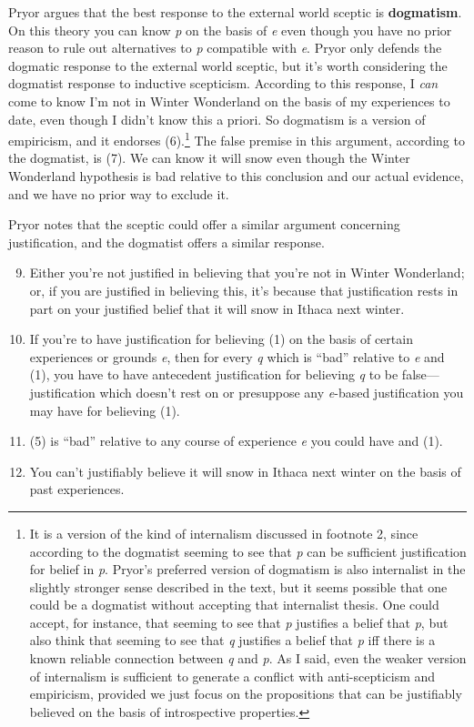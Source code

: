 Pryor argues that the best response to the external world sceptic is
\textbf{dogmatism}. On this theory you can know \emph{p} on the basis of
\emph{e} even though you have no prior reason to rule out alternatives
to \emph{p} compatible with \emph{e}. Pryor only defends the dogmatic
response to the external world sceptic, but it's worth considering the
dogmatist response to inductive scepticism. According to this response,
I \emph{can} come to know I'm not in Winter Wonderland on the basis of
my experiences to date, even though I didn't know this a priori. So
dogmatism is a version of empiricism, and it endorses (6).\footnote{It
  is a version of the kind of internalism discussed in footnote 2, since
  according to the dogmatist seeming to see that \emph{p} can be
  sufficient justification for belief in \emph{p}. Pryor's preferred
  version of dogmatism is also internalist in the slightly stronger
  sense described in the text, but it seems possible that one could be a
  dogmatist without accepting that internalist thesis. One could accept,
  for instance, that seeming to see that \emph{p} justifies a belief
  that \emph{p}, but also think that seeming to see that \emph{q}
  justifies a belief that \emph{p} iff there is a known reliable
  connection between \emph{q} and \emph{p}. As I said, even the weaker
  version of internalism is sufficient to generate a conflict with
  anti-scepticism and empiricism, provided we just focus on the
  propositions that can be justifiably believed on the basis of
  introspective properties.} The false premise in this argument,
according to the dogmatist, is (7). We can know it will snow even though
the Winter Wonderland hypothesis is bad relative to this conclusion and
our actual evidence, and we have no prior way to exclude it.

Pryor notes that the sceptic could offer a similar argument concerning
justification, and the dogmatist offers a similar response.

\begin{enumerate}
\setcounter{enumi}{8}
\item
  Either you're not justified in believing that you're not in Winter
  Wonderland; or, if you are justified in believing this, it's because
  that justification rests in part on your justified belief that it will
  snow in Ithaca next winter.
\item
  If you're to have justification for believing (1) on the basis of
  certain experiences or grounds \emph{e}, then for every \emph{q} which
  is ``bad'' relative to \emph{e} and (1), you have to have antecedent
  justification for believing \emph{q} to be false---justification which
  doesn't rest on or presuppose any \emph{e}-based justification you may
  have for believing (1).
\item
  (5) is ``bad'' relative to any course of experience \emph{e} you could
  have and (1).
\item
  You can't justifiably believe it will snow in Ithaca next winter on
  the basis of past experiences.
\end{enumerate}


